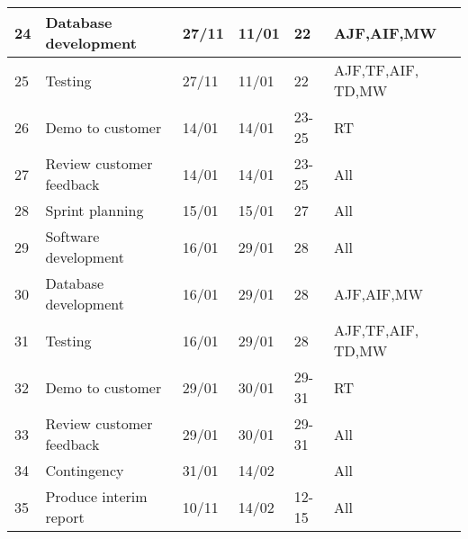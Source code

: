 \begin{longtable}{ | l | l | l | l | l | l | }
24 & Database development & 27/11 & 11/01 & 22 & AJF,AIF,MW \\ \hline
25 & Testing & 27/11 & 11/01 & 22 & AJF,TF,AIF, TD,MW \\ \hline
26 & Demo to customer & 14/01 & 14/01 & 23-25 & RT \\ \hline
27 & Review customer feedback & 14/01 & 14/01 & 23-25 & All \\ \hline
\hline
28 & Sprint planning & 15/01 & 15/01 & 27 & All \\ \hline
29 & Software development & 16/01 & 29/01 & 28 & All \\ \hline
30 & Database development & 16/01 & 29/01 & 28 & AJF,AIF,MW \\ \hline
31 & Testing & 16/01 & 29/01 & 28 & AJF,TF,AIF, TD,MW \\ \hline
32 & Demo to customer & 29/01 & 30/01 & 29-31 & RT \\ \hline
33 & Review customer feedback & 29/01 & 30/01 & 29-31 & All \\ \hline
\hline
34 & Contingency & 31/01 & 14/02 & & All \\ \hline
35 & Produce interim report & 10/11 & 14/02 & 12-15 & All \\ \hline
\end{longtable}
